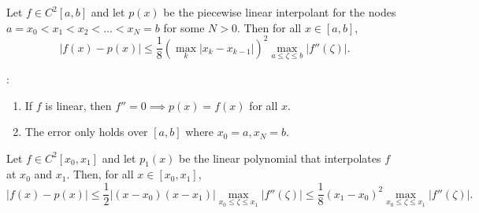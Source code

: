 \documentclass[]{article}
\begin{document}
\begin{theorem}
	Let $f\in C^2[a,b]$ and let $p(x)$ be the piecewise linear interpolant for the nodes $a=x_0<x_1<x_2<\dots<x_N=b$ for some $N>0$.
	Then for all $x\in[a,b]$,
	$$ |f(x)-p(x)| \leq \frac18(\max_k|x_k-x_{k-1}|)^2\max_{a\leq\zeta\leq b}|f''(\zeta)|. $$
\end{theorem}
\begin{note}:
	\begin{enumerate}
		\item If $f$ is linear, then $f''=0 \implies p(x)=f(x)$ for all $x$.
		\item The error only holds over $[a,b]$ where $x_0=a,x_N=b$.
	\end{enumerate}
\end{note}
\begin{theorem}
	[Linear Interpolation with $N=1$]
	Let $f\in C^2[x_0,x_1]$ and let $p_1(x)$ be the linear polynomial that interpolates $f$ at $x_0$ and $x_1$.
	Then, for all $x\in[x_0,x_1]$,
	$$|f(x)-p(x)|\leq\frac12|(x-x_0)(x-x_1)|\max_{x_0\leq\zeta\leq x_1}|f''(\zeta)|
		\leq \frac18 (x_1-x_0)^2 \max_{x_0\leq\zeta\leq x_1}|f''(\zeta)|. $$
\end{theorem}
\end{document}
